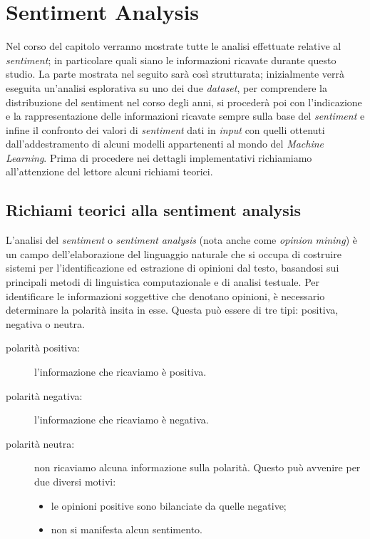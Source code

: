 \chapter{Sentiment Analysis}   
\label{cap:SentimentAnalysis}
	Nel corso del capitolo verranno mostrate tutte le analisi effettuate relative al \textit{sentiment}; in particolare quali siano le informazioni ricavate durante questo studio. La parte mostrata nel seguito sarà così strutturata; inizialmente verrà eseguita un'analisi esplorativa su uno dei due \textit{dataset}, per comprendere la distribuzione del sentiment nel corso degli anni, si procederà poi con l'indicazione e la rappresentazione delle informazioni ricavate sempre sulla base del \textit{sentiment} e infine il confronto dei valori di \textit{sentiment} dati in \textit{input} con quelli ottenuti dall'addestramento di alcuni modelli appartenenti al mondo del \textit{Machine Learning}. Prima di procedere nei dettagli implementativi richiamiamo all'attenzione del lettore alcuni richiami teorici.
	
	\section{Richiami teorici alla sentiment analysis}
		L'analisi del \textit{sentiment} o \textit{sentiment} \textit{analysis} (nota anche come \textit{opinion} \textit{mining}) è un campo dell'elaborazione del linguaggio naturale che si occupa di costruire sistemi per l'identificazione ed estrazione di opinioni dal testo, basandosi sui principali metodi di linguistica computazionale e di analisi testuale. Per identificare le informazioni soggettive che denotano opinioni, è necessario determinare la polarità insita in esse. Questa può essere di tre tipi: positiva, negativa o neutra.
		
		\begin{description}
			\item [polarità positiva:] l'informazione che ricaviamo è positiva.	
			\item [polarità negativa:] l'informazione che ricaviamo è negativa.
			\item [polarità neutra:] non ricaviamo alcuna informazione sulla polarità. Questo può avvenire per due diversi motivi:
			
			\begin{itemize}
				\item le opinioni positive sono bilanciate da quelle negative;
				\item non si manifesta alcun sentimento.
			\end{itemize}
			
	\end{description}
	
